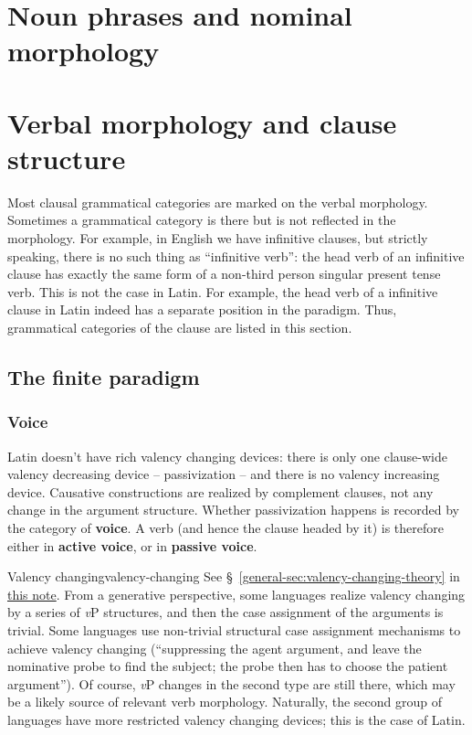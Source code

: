 \documentclass[UTF8, a4paper, oneside]{report}
\newcommand*{\citesec}[1]{\S~{#1}}
\newcommand*{\concept}[1]{\textbf{#1}}
\newcommand{\general}{\href{../methodology/glossing.pdf}{this note}}
\newcommand{\vP}{\textit{v}P}
\begin{document}
\section{Noun phrases and nominal morphology}

\section{Verbal morphology and clause structure}\label{sec:verb-inflection-abs}

Most clausal grammatical categories are marked on the verbal morphology.
Sometimes a grammatical category is there but is not reflected in the morphology.
For example, in English we have infinitive clauses,
but strictly speaking, there is no such thing as ``infinitive verb'':
the head verb of an infinitive clause 
has exactly the same form of a non-third person singular present tense verb.
This is not the case in Latin.
For example, the head verb of a infinitive clause in Latin 
indeed has a separate position in the paradigm.
Thus, grammatical categories of the clause are listed in this section.

\subsection{The finite paradigm}

\subsubsection{Voice}

Latin doesn't have rich valency changing devices:
there is only one clause-wide valency decreasing device -- passivization -- 
and there is no valency increasing device.
Causative constructions are realized by complement clauses,
not any change in the argument structure.
Whether passivization happens is recorded by the category of \concept{voice}.
A verb (and hence the clause headed by it) is therefore either in \concept{active voice},
or in \concept{passive voice}.

\begin{theorybox}{Valency changing}{valency-changing}
    See \citesec{\ref{general-sec:valency-changing-theory}} in \general.
    From a generative perspective, some languages realize valency changing 
    by a series of \vP{} structures, and then the case assignment of the arguments is trivial.
    Some languages use non-trivial structural case assignment mechanisms
    to achieve valency changing 
    (``suppressing the agent argument, 
    and leave the nominative probe to find the subject;
    the probe then has to choose the patient argument'').
    Of course, \vP{} changes in the second type are still there,
    which may be a likely source of relevant verb morphology.
    Naturally, the second group of languages have more restricted valency changing devices;
    this is the case of Latin.
\end{theorybox}
\end{document}
